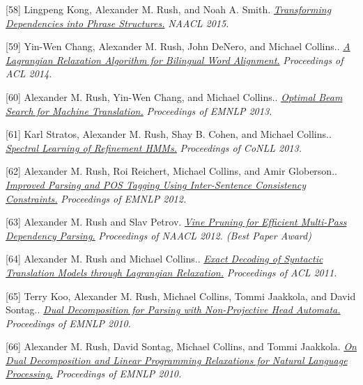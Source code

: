 \documentclass[10pt]{article}
\begin{document}
\medskip


[58] \ind Lingpeng Kong, Alexander M. Rush, and Noah A. Smith. \emph{\href{ http://people.seas.harvard.edu/~srush/naacl15.pdf }{ Transforming Dependencies into Phrase Structures.} }\emph{ NAACL 2015. }

\medskip




[59] \ind Yin-Wen Chang, Alexander M. Rush, John DeNero, and Michael Collins.. \emph{\href{ http://people.csail.mit.edu/srush/ }{ A Lagrangian Relaxation Algorithm for Bilingual Word Alignment.} }\emph{ Proceedings of ACL 2014. }

[60] \ind Alexander M. Rush, Yin-Wen Chang, and Michael Collins.. \emph{\href{ None }{ Optimal Beam Search for Machine Translation.} }\emph{ Proceedings of EMNLP 2013. }

[61] \ind Karl Stratos, Alexander M. Rush, Shay B. Cohen, and Michael Collins.. \emph{\href{ http://www.cs.columbia.edu/~stratos/research/conll13rhmm.pdf }{ Spectral Learning of Refinement HMMs.} }\emph{ Proceedings of CoNLL 2013. }

[62] \ind Alexander M. Rush, Roi Reichert, Michael Collins, and Amir Globerson.. \emph{\href{ http://people.csail.mit.edu/srush/emnlp2012.pdf.pdf }{ Improved Parsing and POS Tagging Using Inter-Sentence Consistency Constraints.} }\emph{ Proceedings of EMNLP 2012. }

[63] \ind Alexander M. Rush and Slav Petrov. \emph{\href{ http://people.csail.mit.edu/srush/vine-paper.pdf }{ Vine Pruning for Efficient Multi-Pass Dependency Parsing.} }\emph{ Proceedings of NAACL 2012. (Best Paper Award) }

[64] \ind Alexander M. Rush and Michael Collins.. \emph{\href{ http://people.csail.mit.edu/srush/exdecmt.pdf }{ Exact Decoding of Syntactic Translation Models through Lagrangian Relaxation.} }\emph{ Proceedings of ACL 2011. }

[65] \ind Terry Koo, Alexander M. Rush, Michael Collins, Tommi Jaakkola, and David Sontag.. \emph{\href{ http://people.csail.mit.edu/maestro/papers/koo10mstdd.pdf }{ Dual Decomposition for Parsing with Non-Projective Head Automata.} }\emph{ Proceedings of EMNLP 2010. }

[66] \ind Alexander M. Rush, David Sontag, Michael Collins, and Tommi Jaakkola. \emph{\href{ http://people.csail.mit.edu/dsontag/papers/RusSonColJaa_emnlp10.pdf }{ On Dual Decomposition and Linear Programming Relaxations for Natural Language Processing.} }\emph{ Proceedings of EMNLP 2010. }
\end{document}
